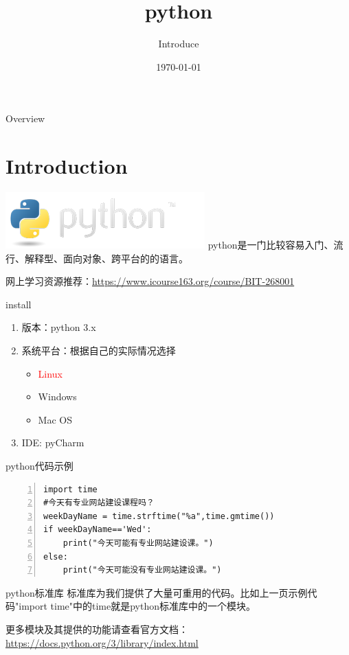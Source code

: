 \documentclass{beamer}
\title[Django]{python} %
\subtitle{Introduce}
\author{} %
\institute[计算机科学与技术学院] %
{
贵州大学 \\ %
\medskip
\textit{hnzhang1@gzu.edu.cn} %
}
\date{\today} %
\begin{document}
\begin{frame}
\titlepage %
\end{frame}
\begin{frame}{Overview}
\tableofcontents
\end{frame}
\section{Introduction}
\begin{frame}{}
\includegraphics{python-logo.png}
python是一门比较容易入门、流行、解释型、面向对象、跨平台的的语言。

网上学习资源推荐：\url{https://www.icourse163.org/course/BIT-268001}
\end{frame}
\begin{frame}{install}
\begin{enumerate}
\item
版本：python 3.x
\item
系统平台：根据自己的实际情况选择
\begin{itemize}
\item
\textcolor{red}{Linux}
\item
Windows
\item
Mac OS
\end{itemize}
\item
IDE: pyCharm
\end{enumerate}
\end{frame}
\begin{frame}[fragile]{}
\begin{block}{python代码示例}
\begin{Verbatim}[numbers=left,frame=single,rulecolor=\color{red}]
import time
#今天有专业网站建设课程吗？
weekDayName = time.strftime("%a",time.gmtime())
if weekDayName=='Wed':
    print("今天可能有专业网站建设课。")
else:
    print("今天可能没有专业网站建设课。")
\end{Verbatim}
\end{block}

\end{frame}

\begin{frame}{python标准库}
标准库为我们提供了大量可重用的代码。比如上一页示例代码"import time"中的time就是python标准库中的一个模块。

更多模块及其提供的功能请查看官方文档：\url{https://docs.python.org/3/library/index.html}
\end{frame}
\end{document}
